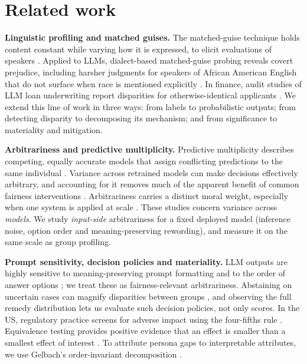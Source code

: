 \section{Related work}

\textbf{Linguistic profiling and matched guises.} The matched-guise technique holds content constant while varying how it is expressed, to elicit evaluations of speakers \cite{lambert1960}. Applied to LLMs, dialect-based matched-guise probing reveals covert prejudice, including harsher judgments for speakers of African American English that do not surface when race is mentioned explicitly \cite{hofmann2024}. In finance, audit studies of LLM loan underwriting report disparities for otherwise-identical applicants \cite{bowen2024}. We extend this line of work in three ways: from labels to probabilistic outputs; from detecting disparity to decomposing its mechanism; and from significance to materiality and mitigation.

\textbf{Arbitrariness and predictive multiplicity.} Predictive multiplicity describes competing, equally accurate models that assign conflicting predictions to the same individual \cite{marx2020}. Variance across retrained models can make decisions effectively arbitrary, and accounting for it removes much of the apparent benefit of common fairness interventions \cite{cooper2024}. Arbitrariness carries a distinct moral weight, especially when one system is applied at scale \cite{creel2022}. These studies concern variance across \emph{models}. We study \emph{input-side} arbitrariness for a fixed deployed model (inference noise, option order and meaning-preserving rewording), and measure it on the same scale as group profiling.

\textbf{Prompt sensitivity, decision policies and materiality.} LLM outputs are highly sensitive to meaning-preserving prompt formatting \cite{sclar2024} and to the order of answer options \cite{pezeshkpour2024}; we treat these as fairness-relevant arbitrariness. Abstaining on uncertain cases can magnify disparities between groups \cite{jones2021}, and observing the full remedy distribution lets us evaluate such decision policies, not only scores. In the US, regulatory practice screens for adverse impact using the four-fifths rule \cite{cfr1607}. Equivalence testing provides positive evidence that an effect is smaller than a smallest effect of interest \cite{lakens2017}. To attribute persona gaps to interpretable attributes, we use Gelbach's order-invariant decomposition \cite{gelbach2016}.

